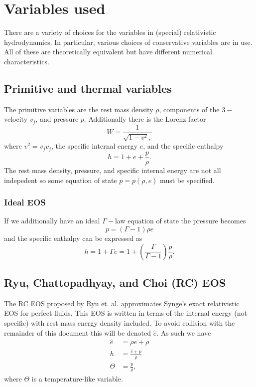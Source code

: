 \documentclass{article}
\begin{document}
\section{Variables used}
There are a variety of choices for the variables in (special) relativistic hydrodynamics. In particular, various choices of conservative variables are in use. All of these are theoretically equivalent but have different numerical characteristics.

\subsection{Primitive and thermal variables}
The primitive variables are the rest mass density $\rho$, components of the $3-$velocity $v_j$, and pressure $p$. Additionally there is the Lorenz factor
\begin{equation}
  W = \frac{1}{\sqrt{1 - v^2},}
\end{equation}
where $v^2 = v_jv_j$, the specific internal energy $e$, and the specific enthalpy
\begin{equation}
  h = 1 + e + \frac{p}{\rho}.
\end{equation}
The rest mass density, pressure, and specific internal energy are not all indepedent so some equation of state $p = p(\rho,e)$ must be specified.

\subsubsection{Ideal EOS}
If we additionally have an ideal $\Gamma-$law equation of state the pressure becomes
\begin{equation}
  p = \left(\Gamma - 1\right)\rho e
\end{equation}
and the specific enthalpy can be expressed as
\begin{equation}
  h = 1 + \Gamma e = 1 + \left(\frac{\Gamma}{\Gamma - 1}\right)\frac{p}{\rho}.
\end{equation}

\subsection{Ryu, Chattopadhyay, and Choi (RC) EOS}
The RC EOS proposed by Ryu et. al. approximates Synge's exact relativistic EOS for perfect fluids. This EOS is written in terms of the internal energy (not specific) with rest mass energy density included. To avoid collision with the remainder of this document this will be denoted $\hat{e}$. As such we have
\begin{align}
  \hat{e} &= \rho e + \rho \\
  h &= \frac{\hat{e} + p}{\rho} \\
  \Theta &= \frac{p}{\rho},
\end{align}
where $\Theta$ is a temperature-like variable.
\end{document}
